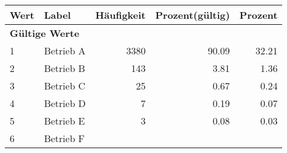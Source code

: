      \begin{longtable}{lXrrr}
     \toprule
     \textbf{Wert} & \textbf{Label} & \textbf{Häufigkeit} & \textbf{Prozent(gültig)} & \textbf{Prozent} \\
     \endhead
     \midrule
     \multicolumn{5}{l}{\textbf{Gültige Werte}}\\

     1 &
     \multicolumn{1}{X}{ Betrieb A   } &


       \num{3380} &
       \num[round-mode=places,round-precision=2]{90.09} &
         \num[round-mode=places,round-precision=2]{32.21} \\

     2 &
     \multicolumn{1}{X}{ Betrieb B   } &


       \num{143} &
       \num[round-mode=places,round-precision=2]{3.81} &
         \num[round-mode=places,round-precision=2]{1.36} \\

     3 &
     \multicolumn{1}{X}{ Betrieb C   } &


       \num{25} &
       \num[round-mode=places,round-precision=2]{0.67} &
         \num[round-mode=places,round-precision=2]{0.24} \\

     4 &
     \multicolumn{1}{X}{ Betrieb D   } &


       \num{7} &
       \num[round-mode=places,round-precision=2]{0.19} &
         \num[round-mode=places,round-precision=2]{0.07} \\

     5 &
     \multicolumn{1}{X}{ Betrieb E   } &


       \num{3} &
       \num[round-mode=places,round-precision=2]{0.08} &
         \num[round-mode=places,round-precision=2]{0.03} \\

     6 &
     \multicolumn{1}{X}{ Betrieb F   } &



\end{longtable}
